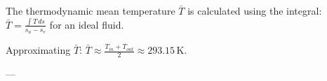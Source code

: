 The thermodynamic mean temperature \( \bar{T} \) is calculated using the integral:  
\( \bar{T} = \frac{\int T \, ds}{s_a - s_e} \) for an ideal fluid.  

Approximating \( \bar{T} \):  
\( \bar{T} \approx \frac{T_{in} + T_{out}}{2} \approx 293.15 \, \text{K} \).  

---
